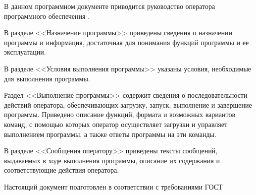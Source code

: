 \newpage\annotation

В данном программном документе приводится руководство оператора программного обеспечения \programname.

В разделе <<Назначение программы>> приведены сведения о назначении программы и информация, достаточная для понимания функций программы и ее эксплуатации.

В разделе <<Условия выполнения программы>> указаны условия, необходимые для выполнения программы.

Раздел <<Выполнение программы>> содержит сведения о последовательности действий оператора, обеспечивающих загрузку, запуск, выполнение и завершение программы. Приведено описание функций, формата и возможных вариантов команд, с помощью которых оператор осуществляет загрузки и управляет выполнением программы, а также ответы программы на эти команды.

В разделе <<Сообщения оператору>> приведены тексты сообщений, выдаваемых в ходе выполнения программы, описание их содержания и соответствующие действия оператора.

Настоящий документ подготовлен в соответствии с требованиями ГОСТ~\cite{gost19505}
